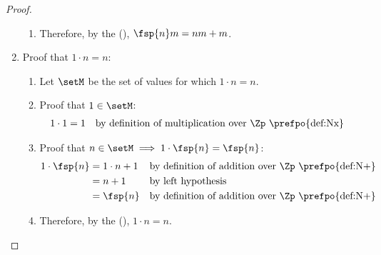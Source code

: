 \begin{proof}
\begin{enumerate}
\begin{enumerate}
      \item Therefore, by the  (),
            $\fsp{n}m = nm+m$.
    \end{enumerate}

  \item Proof that $1\cdot n = n$:
    \begin{enumerate}
      \item Let $\setM$ be the set of values for which $1\cdot n = n$.
      \item Proof that $1\in\setM$:
        \begin{align*}
          1\cdot1
            &= 1
            && \text{by definition of multiplication over $\Zp$ \prefpo{def:Nx}}
        \end{align*}

      \item Proof that $n\in\setM\implies 1\cdot\fsp{n} = \fsp{n}$:
        \begin{align*}
          1 \cdot \fsp{n}
            &= 1\cdot n + 1
            && \text{by definition of addition over $\Zp$ \prefpo{def:N+}}
          \\&= n + 1
            && \text{by left hypothesis}
          \\&= \fsp{n}
            && \text{by definition of addition over $\Zp$ \prefpo{def:N+}}
        \end{align*}

      \item Therefore, by the  (),
            $1\cdot n = n$.
    \end{enumerate}

\end{enumerate}
\end{proof}




